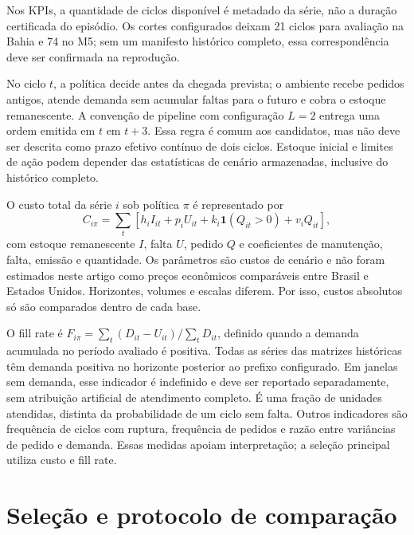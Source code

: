 \documentclass[preprint,12pt]{elsarticle}
\begin{document}
Nos KPIs, a quantidade de ciclos disponível é metadado da série, não a duração certificada do episódio. Os cortes configurados deixam 21 ciclos para avaliação na Bahia e 74 no M5; sem um manifesto histórico completo, essa correspondência deve ser confirmada na reprodução.

No ciclo $t$, a política decide antes da chegada prevista; o ambiente recebe pedidos antigos, atende demanda sem acumular faltas para o futuro e cobra o estoque remanescente. A convenção de pipeline com configuração $L=2$ entrega uma ordem emitida em $t$ em $t+3$. Essa regra é comum aos candidatos, mas não deve ser descrita como prazo efetivo contínuo de dois ciclos. Estoque inicial e limites de ação podem depender das estatísticas de cenário armazenadas, inclusive do histórico completo.

O custo total da série $i$ sob política $\pi$ é representado por
\begin{equation}
 C_{i\pi}=\sum_t\left[h_i I_{it}+p_i U_{it}+k_i\mathbf{1}(Q_{it}>0)+v_i Q_{it}\right],
\end{equation}
com estoque remanescente $I$, falta $U$, pedido $Q$ e coeficientes de manutenção, falta, emissão e quantidade. Os parâmetros são custos de cenário e não foram estimados neste artigo como preços econômicos comparáveis entre Brasil e Estados Unidos. Horizontes, volumes e escalas diferem. Por isso, custos absolutos só são comparados dentro de cada base.

O fill rate é $F_{i\pi}=\sum_t(D_{it}-U_{it})/\sum_tD_{it}$, definido quando a demanda acumulada no período avaliado é positiva. Todas as séries das matrizes históricas têm demanda positiva no horizonte posterior ao prefixo configurado. Em janelas sem demanda, esse indicador é indefinido e deve ser reportado separadamente, sem atribuição artificial de atendimento completo. É uma fração de unidades atendidas, distinta da probabilidade de um ciclo sem falta. Outros indicadores são frequência de ciclos com ruptura, frequência de pedidos e razão entre variâncias de pedido e demanda. Essas medidas apoiam interpretação; a seleção principal utiliza custo e fill rate.

\section{Seleção e protocolo de comparação}
\end{document}
